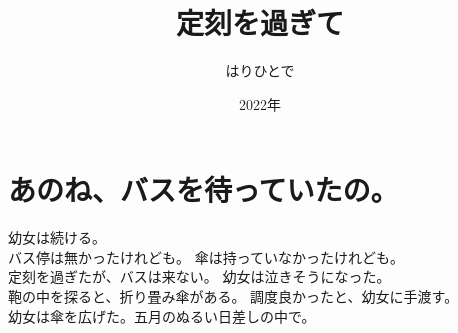 \documentclass{jarticle}
\begin{document}
\title{定刻を過ぎて}
\author{はりひとで}
\date{2022年}

\maketitle

\section{あのね、バスを待っていたの。}

\noindent 幼女は続ける。\\
バス停は無かったけれども。 傘は持っていなかったけれども。 \\
定刻を過ぎたが、バスは来ない。 幼女は泣きそうになった。 \\
鞄の中を探ると、折り畳み傘がある。 調度良かったと、幼女に手渡す。\\
幼女は傘を広げた。五月のぬるい日差しの中で。
\end{document}
